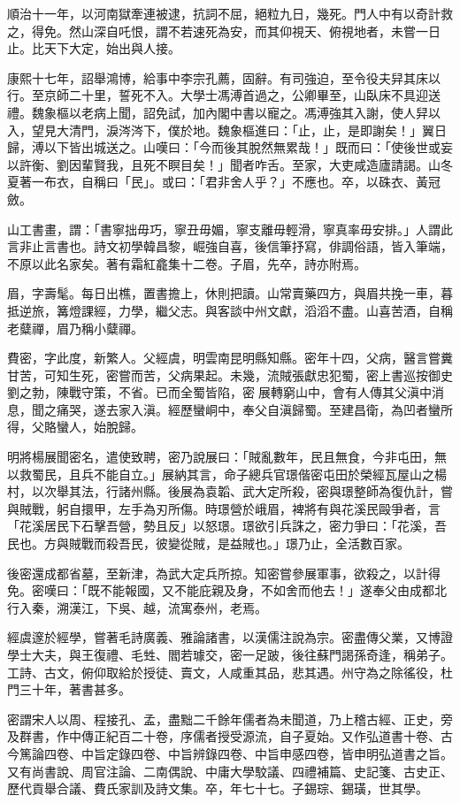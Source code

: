 \begin{pinyinscope}
順治十一年，以河南獄牽連被逮，抗詞不屈，絕粒九日，幾死。門人中有以奇計救之，得免。然山深自吒恨，謂不若速死為安，而其仰視天、俯視地者，未嘗一日止。比天下大定，始出與人接。

康熙十七年，詔舉鴻博，給事中李宗孔薦，固辭。有司強迫，至令役夫舁其床以行。至京師二十里，誓死不入。大學士馮溥首過之，公卿畢至，山臥床不具迎送禮。魏象樞以老病上聞，詔免試，加內閣中書以寵之。馮溥強其入謝，使人舁以入，望見大清門，淚涔涔下，僕於地。魏象樞進曰：「止，止，是即謝矣！」翼日歸，溥以下皆出城送之。山嘆曰：「今而後其脫然無累哉！」既而曰：「使後世或妄以許衡、劉因輩賢我，且死不瞑目矣！」聞者咋舌。至家，大吏咸造廬請謁。山冬夏著一布衣，自稱曰「民」。或曰：「君非舍人乎？」不應也。卒，以硃衣、黃冠斂。

山工書畫，謂：「書寧拙毋巧，寧丑毋媚，寧支離毋輕滑，寧真率毋安排。」人謂此言非止言書也。詩文初學韓昌黎，崛強自喜，後信筆抒寫，俳調俗語，皆入筆端，不原以此名家矣。著有霜紅龕集十二卷。子眉，先卒，詩亦附焉。

眉，字壽髦。每日出樵，置書擔上，休則把讀。山常賣藥四方，與眉共挽一車，暮抵逆旅，篝燈課經，力學，繼父志。與客談中州文獻，滔滔不盡。山喜苦酒，自稱老糵禪，眉乃稱小糵禪。

費密，字此度，新繁人。父經虞，明雲南昆明縣知縣。密年十四，父病，醫言嘗糞甘苦，可知生死，密嘗而苦，父病果起。未幾，流賊張獻忠犯蜀，密上書巡按御史劉之勃，陳戰守策，不省。已而全蜀皆陷，密展轉窮山中，會有人傳其父滇中消息，聞之痛哭，遂去家入滇。經歷蠻峒中，奉父自滇歸蜀。至建昌衛，為凹者蠻所得，父賂蠻人，始脫歸。

明將楊展聞密名，遣使致聘，密乃說展曰：「賊亂數年，民且無食，今非屯田，無以救蜀民，且兵不能自立。」展納其言，命子總兵官璟偕密屯田於榮經瓦屋山之楊村，以次舉其法，行諸州縣。後展為袁韜、武大定所殺，密與璟整師為復仇計，嘗與賊戰，躬自擐甲，左手為刃所傷。時璟營於峨眉，裨將有與花溪民毆爭者，言「花溪居民下石擊吾營，勢且反」以怒璟。璟欲引兵誅之，密力爭曰：「花溪，吾民也。方與賊戰而殺吾民，彼變從賊，是益賊也。」璟乃止，全活數百家。

後密還成都省墓，至新津，為武大定兵所掠。知密嘗參展軍事，欲殺之，以計得免。密嘆曰：「既不能報國，又不能庇親及身，不如舍而他去！」遂奉父由成都北行入秦，溯漢江，下吳、越，流寓泰州，老焉。

經虞邃於經學，嘗著毛詩廣義、雅論諸書，以漢儒注說為宗。密盡傳父業，又博證學士大夫，與王復禮、毛甡、閻若璩交，密一足跛，後往蘇門謁孫奇逢，稱弟子。工詩、古文，俯仰取給於授徒、賣文，人咸重其品，悲其遇。州守為之除徭役，杜門三十年，著書甚多。

密謂宋人以周、程接孔、孟，盡黜二千餘年儒者為未聞道，乃上稽古經、正史，旁及群書，作中傳正紀百二十卷，序儒者授受源流，自子夏始。又作弘道書十卷、古今篤論四卷、中旨定錄四卷、中旨辨錄四卷、中旨申感四卷，皆申明弘道書之旨。又有尚書說、周官注論、二南偶說、中庸大學駮議、四禮補篇、史記箋、古史正、歷代貢舉合議、費氏家訓及詩文集。卒，年七十七。子錫琮、錫璜，世其學。


\end{pinyinscope}
